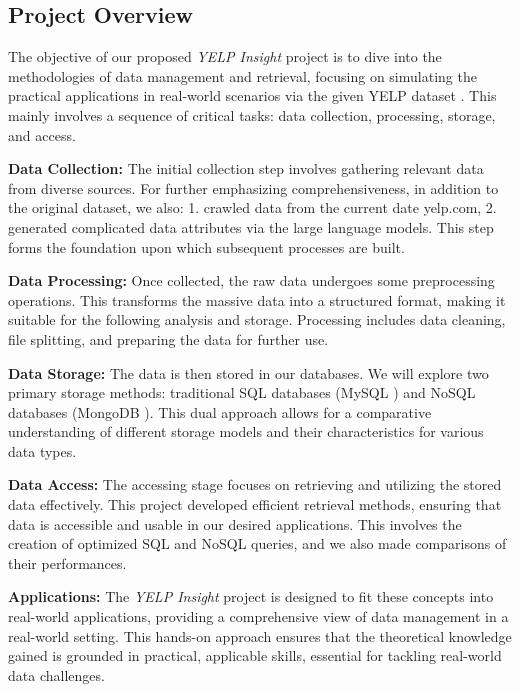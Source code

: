 \documentclass[runningheads]{llncs}
\begin{document}
\subsection{Project Overview}

The objective of our proposed \textit{YELP Insight} project is to dive into the methodologies of data management and retrieval, focusing on simulating the practical applications in real-world scenarios via the given YELP dataset \cite{YelpDataset}. This mainly involves a sequence of critical tasks: data collection, processing, storage, and access.

\textbf{Data Collection:} The initial collection step involves gathering relevant data from diverse sources. For further emphasizing comprehensiveness, in addition to the original dataset, we also: 1. crawled data from the current date yelp.com, 2. generated complicated data attributes via the large language models. This step forms the foundation upon which subsequent processes are built.

\textbf{Data Processing:} Once collected, the raw data undergoes some preprocessing operations. This transforms the massive data into a structured format, making it suitable for the following analysis and storage. Processing includes data cleaning, file splitting, and preparing the data for further use.

\textbf{Data Storage:} The data is then stored in our databases. We will explore two primary storage methods: traditional SQL databases (MySQL \cite{MySQL}) and NoSQL databases (MongoDB \cite{MongoDB}). This dual approach allows for a comparative understanding of different storage models and their characteristics for various data types.

\textbf{Data Access:} The accessing stage focuses on retrieving and utilizing the stored data effectively. This project developed efficient retrieval methods, ensuring that data is accessible and usable in our desired applications. This involves the creation of optimized SQL and NoSQL queries, and we also made comparisons of their performances.

\textbf{Applications:} The \textit{YELP Insight} project is designed to fit these concepts into real-world applications, providing a comprehensive view of data management in a real-world setting. This hands-on approach ensures that the theoretical knowledge gained is grounded in practical, applicable skills, essential for tackling real-world data challenges.
\end{document}
